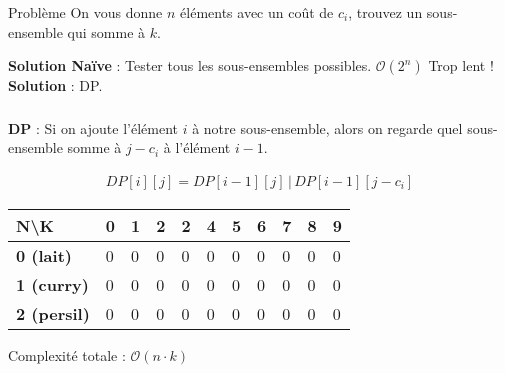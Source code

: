 
\begin{frame}
    \frametitle{\problemtitle}
    \begin{block}
        {Problème} On vous donne $n$ éléments avec un coût de $c_i$, trouvez un sous-ensemble qui somme à $k$.
    \end{block}
    \pause
    \textbf{Solution Naïve} : Tester tous les sous-ensembles possibles. $\mathcal{O}(2^n)$ Trop lent ! \\
    \pause
    \textbf{Solution} : DP. \\
    \pause
\end{frame}
\begin{frame}
    \frametitle{\problemtitle}
    \textbf{DP} : Si on ajoute l'élément $i$ à notre sous-ensemble, alors on regarde quel sous-ensemble somme à $j-c_i$ à l'élément $i-1$.
    
    \begin{align*}
        DP[i][j] = DP[i-1][j] \,|\, DP[i-1][j-c_i]
    \end{align*}
    
    \begin{table}[]
      \begin{tabular}{|l|l|l|l|l|l|l|l|l|l|l|}
      \hline
      \textbf{N\textbackslash{}K} & \textbf{0} & \textbf{1} & \textbf{2} & \textbf{2} & \textbf{4} & \textbf{5} & \textbf{6} & \textbf{7} & \textbf{8} & \textbf{9} \\ \hline
      \textbf{0 (lait)}   & 0 & 0 & 0 & 0 & 0 & 0 & 0 & 0 & 0 & 0 \\ \hline
      \textbf{1 (curry)}  & 0 & 0 & 0 & 0 & 0 & 0 & 0 & 0 & 0 & 0 \\ \hline
      \textbf{2 (persil)} & 0 & 0 & 0 & 0 & 0 & 0 & 0 & 0 & 0 & 0 \\ \hline
      \end{tabular}
    \end{table}
    
    Complexité totale : $\mathcal{O}(n \cdot k)$
    \pause\solvestats
\end{frame}
